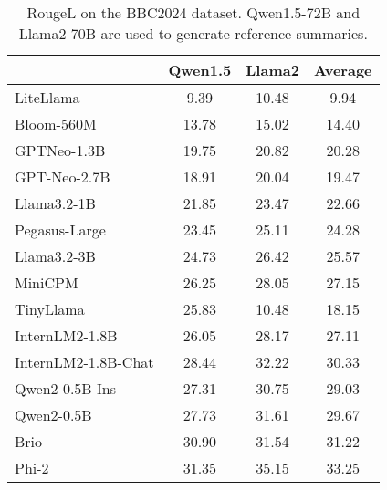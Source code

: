 \documentclass[a4paper]{article}
\begin{document}
\begin{table}[h]
\centering 
\caption{RougeL on the BBC2024 dataset. Qwen1.5-72B and Llama2-70B are used to generate reference summaries.}
\begin{tabular}{lccc}
\hline
\multicolumn{1}{l}{} & \multicolumn{1}{l}{Qwen1.5} & \multicolumn{1}{l}{Llama2} & \multicolumn{1}{l}{Average} \\ \hline
LiteLlama            & 9.39                        & 10.48                      & 9.94                        \\
Bloom-560M           & 13.78                       & 15.02                      & 14.40                       \\
GPTNeo-1.3B          & 19.75                       & 20.82                      & 20.28                       \\
GPT-Neo-2.7B         & 18.91                       & 20.04                      & 19.47                       \\
Llama3.2-1B          & 21.85                       & 23.47                      & 22.66                       \\
Pegasus-Large        & 23.45                       & 25.11                      & 24.28                       \\
Llama3.2-3B          & 24.73                       & 26.42                      & 25.57                       \\
MiniCPM              & 26.25                       & 28.05                      & 27.15                       \\
TinyLlama            & 25.83                       & 10.48                      & 18.15                       \\
InternLM2-1.8B       & 26.05                       & 28.17                      & 27.11                       \\
InternLM2-1.8B-Chat  & 28.44                       & 32.22                      & 30.33                       \\
Qwen2-0.5B-Ins       & 27.31                       & 30.75                      & 29.03                       \\
Qwen2-0.5B           & 27.73                       & 31.61                      & 29.67                       \\
Brio                 & 30.90                       & 31.54                      & 31.22                       \\
Phi-2                & 31.35                       & 35.15                      & 33.25                       \\

\end{tabular}
\end{table}
\end{document}
